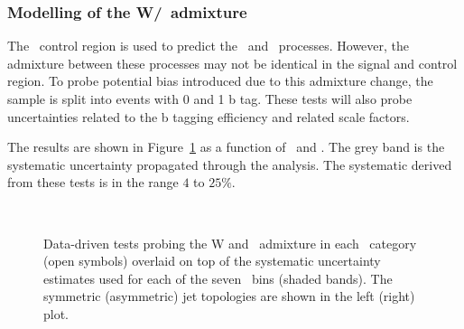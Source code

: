\subsubsection{Modelling of the W/\ttbar~admixture}

The \mj~control region is used to predict the \wj~and \ttbar~processes. However, the admixture
between these processes may not be identical in the signal and control region.
To probe potential bias introduced due to this admixture change, the sample is split into events with
0 and 1 b tag. These tests will also probe uncertainties related to the b tagging 
efficiency and related scale factors. 

The results are shown in Figure~\ref{fig:closureBTag} as a function of \scalht~and \njet. 
The grey band is the systematic uncertainty propagated through the analysis. 
The systematic derived from these tests is in the range $4$ to $25\%$.

\begin{figure}[h!]
  \begin{center}
    ~~
    \caption{Data-driven tests probing the W and \ttbar~admixture 
      in each \njet~category (open symbols) overlaid on top of the systematic
      uncertainty estimates used for each of the seven \scalht~bins
      (shaded bands). 
      The symmetric (asymmetric) jet topologies are shown in the left (right) plot.      
    }
    \label{fig:closureBTag}
  \end{center} 
\end{figure}

